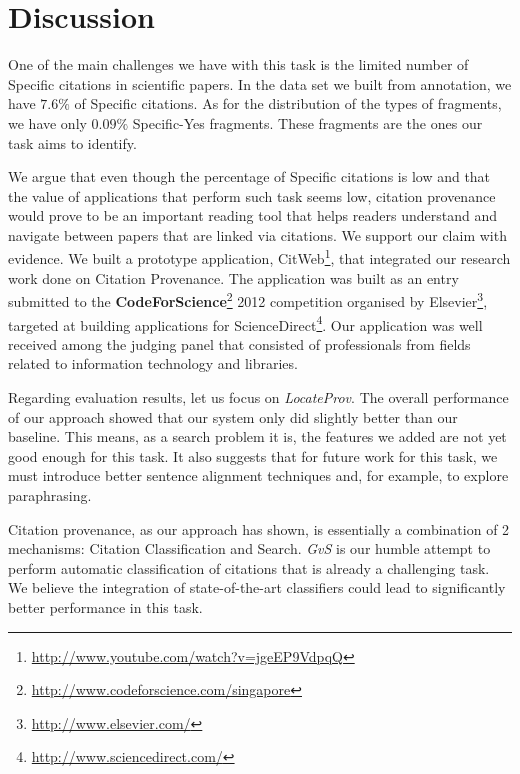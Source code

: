 \chapter{Discussion}
\label{discussion}
One of the main challenges we have with this task is the limited number of Specific citations in scientific papers. In the data set we built from annotation, we have $7.6\%$ of Specific citations. As for the distribution of the types of fragments, we have only $0.09\%$ Specific-Yes fragments. These fragments are the ones our task aims to identify.

We argue that even though the percentage of Specific citations is low and that the value of applications that perform such task seems low, citation provenance would prove to be an important reading tool that helps readers understand and navigate between papers that are linked via citations. We support our claim with evidence. We built a prototype application, CitWeb\footnote{\url{http://www.youtube.com/watch?v=jgeEP9VdpqQ}}, that integrated our research work done on Citation Provenance. The application was built as an entry submitted to the \textbf{CodeForScience}\footnote{\url{http://www.codeforscience.com/singapore}} 2012 competition organised by Elsevier\footnote{\url{http://www.elsevier.com/}}, targeted at building applications for ScienceDirect\footnote{\url{http://www.sciencedirect.com/}}. Our application was well received among the judging panel that consisted of professionals from fields related to information technology and libraries.

Regarding evaluation results, let us focus on \textit{LocateProv}. The overall performance of our approach showed that our system only did slightly better than our baseline. This means, as a search problem it is, the features we added are not yet good enough for this task. It also suggests that for future work for this task, we must introduce better sentence alignment techniques and, for example, to explore paraphrasing.

Citation provenance, as our approach has shown, is essentially a combination of 2 mechanisms: Citation Classification and Search. \textit{GvS} is our humble attempt to perform automatic classification of citations that is already a challenging task. We believe the integration of state-of-the-art classifiers could lead to significantly better performance in this task.

